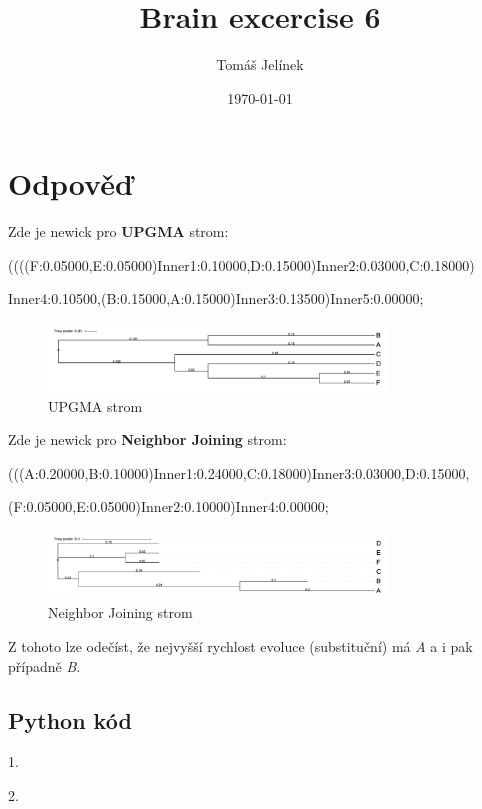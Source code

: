 \documentclass{article}
\title{Brain excercise 6}
\author{Tomáš Jelínek}
\date{\today}
\begin{document}
\maketitle

\section*{Odpověď}

Zde je newick pro \textbf{UPGMA} strom:

((((F:0.05000,E:0.05000)Inner1:0.10000,D:0.15000)Inner2:0.03000,C:0.18000)

Inner4:0.10500,(B:0.15000,A:0.15000)Inner3:0.13500)Inner5:0.00000;

\begin{figure}[H]
    \centering
    \includegraphics[width=0.8\textwidth]{upgma.png}
    \caption{UPGMA strom}
    \label{fig:upgma}    
\end{figure}

Zde je newick pro \textbf{Neighbor Joining} strom:

(((A:0.20000,B:0.10000)Inner1:0.24000,C:0.18000)Inner3:0.03000,D:0.15000,

(F:0.05000,E:0.05000)Inner2:0.10000)Inner4:0.00000;

\begin{figure}[H]
    \centering
    \includegraphics[width=0.8\textwidth]{nj.png}
    \caption{Neighbor Joining strom}
    \label{fig:nj}
\end{figure}

Z tohoto lze odečíst, že nejvyšší rychlost evoluce (substituční) má \textit{A} a i pak případně \textit{B}.

\subsection*{Python kód}

1.


2.

\end{document}
